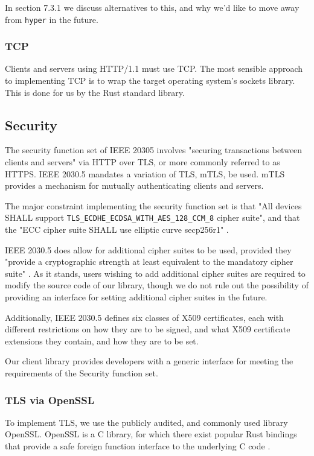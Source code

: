 In section 7.3.1 we discuss alternatives to this, and why we'd like to move away from \texttt{hyper} in the future.

\subsubsection{TCP}
Clients and servers using HTTP/1.1 must use TCP. The most sensible approach to implementing TCP is to wrap the target operating system's sockets library. This is done for us by the Rust standard library.

\subsection{Security}
The security function set of IEEE 20305 involves "securing transactions between clients and servers" via HTTP over TLS, or more commonly referred to as HTTPS. IEEE 2030.5 mandates a variation of TLS, mTLS, be used. mTLS provides a mechanism for mutually authenticating clients and servers. 

The major constraint implementing the security function set is that "All devices SHALL support \texttt{TLS\_ECDHE\_ECDSA\_WITH\_AES\_128\_CCM\_8} cipher suite", and that the "ECC cipher suite SHALL use elliptic curve secp256r1" \cite{IEEE2030.5}.

IEEE 2030.5 does allow for additional cipher suites to be used, provided they "provide a cryptographic strength at least equivalent to the mandatory cipher suite" \cite{IEEE2030.5}.  As it stands, users wishing to add additional cipher suites are required to modify the source code of our library, though we do not rule out the possibility of providing an interface for setting additional cipher suites in the future.

Additionally, IEEE 2030.5 defines six classes of X509 certificates, each with different restrictions on how they are to be signed, and what  X509 certificate extensions they contain, and how they are to be set.

Our client library provides developers with a generic interface for meeting the requirements of the Security function set.

\subsubsection{TLS via OpenSSL}
To implement TLS, we use the publicly audited, and commonly used library OpenSSL. OpenSSL is a C library, for which there exist popular Rust bindings that provide a safe foreign function interface to the underlying C code \cite{openssl}. 

